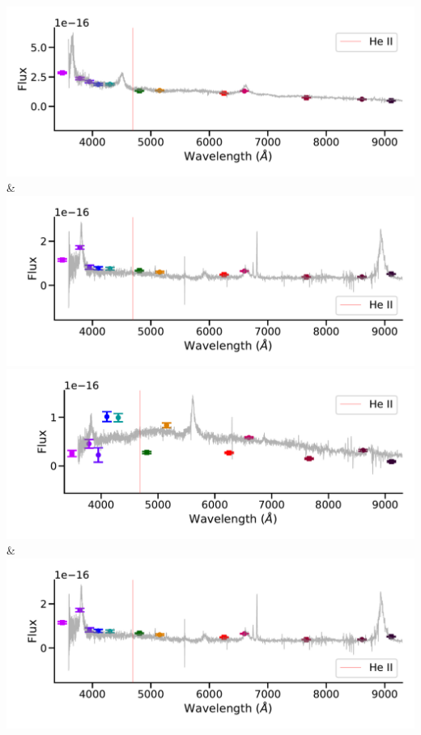 \includegraphics[width=0.5\linewidth, clip]{spec-9395-58113-0530.pdf} & \includegraphics[width=0.5\linewidth, clip]{spec-9409-58051-0529 (copy).pdf} \\
\includegraphics[width=0.5\linewidth, clip]{spec-9399-58125-0449.pdf} & \includegraphics[width=0.5\linewidth, clip]{spec-9409-58051-0529.pdf} \\
